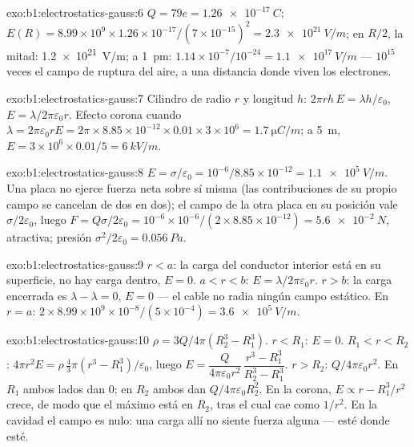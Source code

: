 \begin{solution}{exo:b1:electrostatics-gauss:6}
$Q = 79e = \qty{1.26e-17}{C}$; $E(R) = 8.99 \times 10^9 \times 1.26 \times 10^{-17}/
(7 \times 10^{-15})^2 = \qty{2.3e21}{V/m}$; en $R/2$, la mitad: \qty{1.2e21}{V/m}; a
\qty{1}{pm}: $1.14 \times 10^{-7}/10^{-24} = \qty{1.1e17}{V/m}$ --- $10^{15}$ veces
el campo de ruptura del aire, a una distancia donde viven los electrones.
\end{solution}

\begin{solution}{exo:b1:electrostatics-gauss:7}
Cilindro de radio $r$ y longitud $h$: $2\pi rh\,E = \lambda h/\varepsilon_0$, $E =
\lambda/2\pi\varepsilon_0r$. Efecto corona cuando $\lambda = 2\pi\varepsilon_0 rE = 2\pi \times 8.85 \times
10^{-12} \times 0.01 \times 3 \times 10^6 = \qty{1.7}{\micro C/m}$; a \qty{5}{m},
$E = 3 \times 10^6 \times 0.01/5 = \qty{6}{kV/m}$.
\end{solution}

\begin{solution}{exo:b1:electrostatics-gauss:8}
$E = \sigma/\varepsilon_0 = 10^{-6}/8.85 \times 10^{-12} = \qty{1.1e5}{V/m}$. Una placa
no ejerce fuerza neta sobre sí misma (las contribuciones de su propio
campo se cancelan de dos en dos); el campo de la otra placa en su
posición vale $\sigma/2\varepsilon_0$, luego
$F = Q\sigma/2\varepsilon_0 = 10^{-6} \times 10^{-6}/(2 \times 8.85 \times 10^{-12}) =
\qty{5.6e-2}{N}$, atractiva; presión $\sigma^2/2\varepsilon_0 = \qty{0.056}{Pa}$.
\end{solution}

\begin{solution}{exo:b1:electrostatics-gauss:9}
$r < a$: la carga del conductor interior está en su superficie, no hay
carga dentro, $E = 0$. $a < r < b$: $E = \lambda/2\pi\varepsilon_0r$. $r > b$: la
carga encerrada es $\lambda - \lambda = 0$, $E = 0$ --- el cable no radia
ningún campo estático. En $r = a$: $2 \times 8.99 \times 10^9 \times 10^{-8}/(5 \times 10^{-4}) =
\qty{3.6e5}{V/m}$.
\end{solution}

\begin{solution}{exo:b1:electrostatics-gauss:10}
$\rho = 3Q/4\pi(R_2^3 - R_1^3)$. $r < R_1$: $E = 0$. $R_1 < r < R_2$: $4\pi r^2E =
\rho\,\tfrac43\pi(r^3 - R_1^3)/\varepsilon_0$, luego $E = \dfrac{Q}{4\pi\varepsilon_0r^2}\,
\dfrac{r^3 - R_1^3}{R_2^3 - R_1^3}$. $r > R_2$: $Q/4\pi\varepsilon_0r^2$. En $R_1$ ambos
lados dan $0$; en $R_2$ ambos dan $Q/4\pi\varepsilon_0R_2^2$. En la corona, $E
\propto r - R_1^3/r^2$ crece, de modo que el máximo está en $R_2$, tras el
cual cae como $1/r^2$. En la cavidad el campo es nulo: una carga allí no
siente fuerza alguna --- esté donde esté.
\end{solution}


